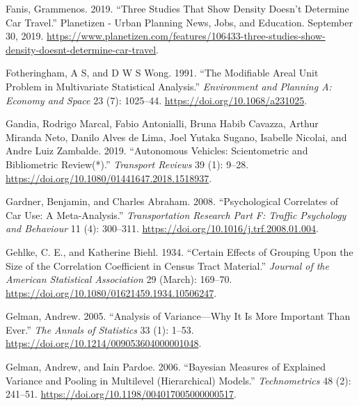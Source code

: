 \documentclass[
  11pt,
  openany]{memoir}
\newlength{\cslhangindent}
\newlength{\cslentryspacingunit} %
\newenvironment{CSLReferences}[2] %
 {%
  \setlength{\parindent}{0pt}
  \ifodd #1
  \let\oldpar\par
  \def\par{\hangindent=\cslhangindent\oldpar}
  \fi
  \setlength{\parskip}{#2\cslentryspacingunit}
 }%
 {}
\begin{document}
\begin{CSLReferences}{1}{0}
\leavevmode{}%
Fanis, Grammenos. 2019. {``Three {Studies That Show Density Doesn}'t {Determine Car Travel}.''} {Planetizen - Urban Planning News, Jobs, and Education}. September 30, 2019. \url{https://www.planetizen.com/features/106433-three-studies-show-density-doesnt-determine-car-travel}.

\leavevmode{}%
Fotheringham, A S, and D W S Wong. 1991. {``The {Modifiable Areal Unit Problem} in {Multivariate Statistical Analysis}.''} \emph{Environment and Planning A: Economy and Space} 23 (7): 1025--44. \url{https://doi.org/10.1068/a231025}.

\leavevmode{}%
Gandia, Rodrigo Marcal, Fabio Antonialli, Bruna Habib Cavazza, Arthur Miranda Neto, Danilo Alves de Lima, Joel Yutaka Sugano, Isabelle Nicolai, and Andre Luiz Zambalde. 2019. {``Autonomous Vehicles: Scientometric and Bibliometric Review(*).''} \emph{Transport Reviews} 39 (1): 9--28. \url{https://doi.org/10.1080/01441647.2018.1518937}.

\leavevmode{}%
Gardner, Benjamin, and Charles Abraham. 2008. {``Psychological Correlates of Car Use: A Meta-Analysis.''} \emph{Transportation Research Part F: Traffic Psychology and Behaviour} 11 (4): 300--311. \url{https://doi.org/10.1016/j.trf.2008.01.004}.

\leavevmode{}%
Gehlke, C. E., and Katherine Biehl. 1934. {``Certain {Effects} of {Grouping} Upon the {Size} of the {Correlation Coefficient} in {Census Tract Material}.''} \emph{Journal of the American Statistical Association} 29 (March): 169--70. \url{https://doi.org/10.1080/01621459.1934.10506247}.

\leavevmode{}%
Gelman, Andrew. 2005. {``Analysis of Variance---Why It Is More Important Than Ever.''} \emph{The Annals of Statistics} 33 (1): 1--53. \url{https://doi.org/10.1214/009053604000001048}.

\leavevmode{}%
Gelman, Andrew, and Iain Pardoe. 2006. {``Bayesian {Measures} of {Explained Variance} and {Pooling} in {Multilevel} ({Hierarchical}) {Models}.''} \emph{Technometrics} 48 (2): 241--51. \url{https://doi.org/10.1198/004017005000000517}.


\end{CSLReferences}
\end{document}
